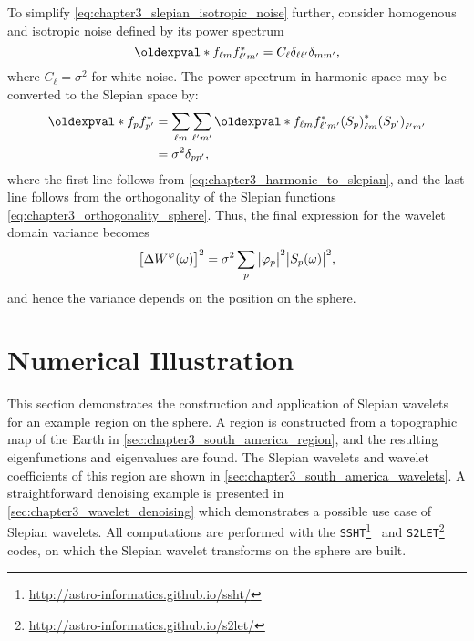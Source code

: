 To simplify \cref{eq:chapter3_slepian_isotropic_noise} further, consider homogenous and isotropic noise defined by its power spectrum
%
\begin{equation}
	\expval{\harmonic{f} \conj{\harmonic[']{f}}}
	= C_{\ell} \delta_{\ell\ell'} \delta_{mm'},
\end{equation}
%
where \(C_{\ell} = \sigma^{2}\) for white noise.
The power spectrum in harmonic space may be converted to the Slepian space by:
%
\begin{align}
	\expval{\slepian{f} \conj{\slepian[']{f}}}
	 & = \harmonicSum \harmonicSum['] \expval{\harmonic{f} \conj{\harmonic[']{f}}} \conj{\harmonic{(\slepian{S})}} \harmonic[']{(\slepian[']{S})} \nonumber \\
	 & = \sigma^{2} \delta_{pp'},
\end{align}
%
where the first line follows from \cref{eq:chapter3_harmonic_to_slepian}, and the last line follows from the orthogonality of the Slepian functions \cref{eq:chapter3_orthogonality_sphere}.
Thus, the final expression for the wavelet domain variance becomes
%
\begin{equation}\label{eq:chapter3_wavelet_variance}
	{\big[\Delta W^{\varphi}(\omega)\big]}^{2}
	= \sigma^{2} \sum\limits_{p} \big\lvert{\varphi}_{p}\big\rvert^{2} \big\lvert{S}_{p}(\omega)\big\rvert^{2},
\end{equation}
%
and hence the variance depends on the position on the sphere.

\section{Numerical Illustration}\label{sec:chapter3_numerical_illustration}

This section demonstrates the construction and application of Slepian wavelets for an example region on the sphere.
A region is constructed from a topographic map of the Earth in \cref{sec:chapter3_south_america_region}, and the resulting eigenfunctions and eigenvalues are found.
The Slepian wavelets and wavelet coefficients of this region are shown in \cref{sec:chapter3_south_america_wavelets}.
A straightforward denoising example is presented in \cref{sec:chapter3_wavelet_denoising} which demonstrates a possible use case of Slepian wavelets.
All computations are performed with the \texttt{SSHT}\footnote{\url{http://astro-informatics.github.io/ssht/}}~\cite{McEwen2011} and \texttt{S2LET}\footnote{\url{http://astro-informatics.github.io/s2let/}}~\cite{Leistedt2013} codes, on which the Slepian wavelet transforms on the sphere are built.

